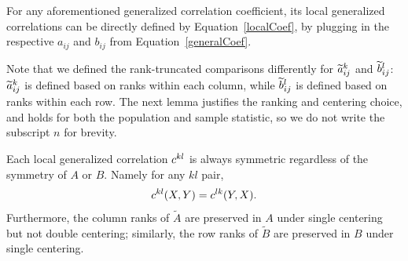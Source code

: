 \documentclass[11pt]{article}
\begin{document}
For any aforementioned generalized correlation coefficient, its local generalized correlations can be directly defined by Equation~\ref{localCoef}, by plugging in the respective $a_{ij}$ and $b_{ij}$ from Equation~\ref{generalCoef}. 

Note that we defined the rank-truncated comparisons differently for $\widetilde{a}_{ij}^k$ and $\widetilde{b}_{ij}^l$: $\widetilde{a}_{ij}^k$ is defined based on ranks within each column, while $\widetilde{b}_{ij}^l$ is defined based on ranks within each row. The next lemma justifies the ranking and centering choice, and holds for both the population and sample statistic, so we do not write the subscript $n$ for brevity.

\begin{lem}
\label{lem2}
Each local generalized correlation $c^{kl}$ is always symmetric regardless of the symmetry of $A$ or $B$. Namely for any $kl$ pair, 
\begin{align*}
c^{kl}(X,Y)=c^{lk}(Y,X).
\end{align*}
Furthermore, the column ranks of $\tilde{A}$ are preserved in $A$ under single centering but not double centering; similarly, the row ranks of $\tilde{B}$ are preserved in $B$ under single centering.
\end{lem}
\end{document}
